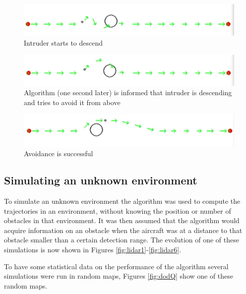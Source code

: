 \begin{figure}[H]
    \centering
    \includegraphics[width=0.7\linewidth]{Figures/07_simulation/nonCoop3/nonCoop35.png}
    \caption{Intruder starts to descend}
    \label{nonCoop35}
\end{figure}

\begin{figure}[H]
    \centering
    \includegraphics[width=0.7\linewidth]{Figures/07_simulation/nonCoop3/nonCoop36.png}
    \caption{Algorithm (one second later) is informed that intruder is descending and tries to avoid it from above}
    \label{nonCoop36}
\end{figure}

\begin{figure}[H]
    \centering
    \includegraphics[width=0.7\linewidth]{Figures/07_simulation/nonCoop3/nonCoop37.png}
    \caption{Avoidance is successful}
    \label{nonCoop37}
\end{figure}

\subsection{Simulating an unknown environment}
To simulate an unknown environment the algorithm was used to compute the trajectories in an environment, without knowing the position or number of obstacles in that environment. It was then assumed that the algorithm would acquire information on an obstacle when the aircraft was at a distance to that obstacle smaller than a certain detection range. The evolution of one of these simulations is now shown in Figures \ref{fig:lidar1}-\ref{fig:lidar6}.


To have some statistical data on the performance of the algorithm several simulations were run in random maps, Figures \ref{fig:dodQ} show one of these random maps.


